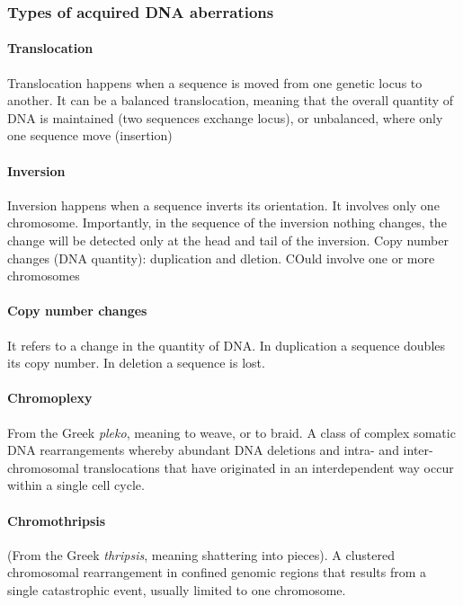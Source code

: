 		\subsubsection{Types of acquired DNA aberrations} \label{subsec:aberrations}
		

			\paragraph*{Translocation}
			Translocation happens when a sequence is moved from one genetic locus to another.
			It can be a balanced translocation, meaning that the overall quantity of DNA is maintained (two sequences exchange locus), or unbalanced, where only one sequence move (insertion) 

			\paragraph*{Inversion}
			Inversion happens when a sequence inverts its orientation. It involves only one 		chromosome.
			Importantly, in the sequence of the inversion nothing changes, the change will be detected only at the head and tail of the inversion.
Copy number changes (DNA quantity): duplication and dletion. COuld involve one or more chromosomes

			\paragraph*{Copy number changes}
			It refers to a change in the quantity of DNA. 
			In duplication a sequence doubles its copy number.
			In deletion a sequence is lost.

			\paragraph*{Chromoplexy}
			From the Greek \textit{pleko}, meaning to weave, or to braid.
A class of complex somatic DNA rearrangements whereby abundant DNA deletions
and intra- and inter-chromosomal translocations that have originated in an
interdependent way occur within a single cell cycle. 

			\paragraph*{Chromothripsis}
			(From the Greek \textit{thripsis}, meaning shattering into pieces).
A clustered chromosomal rearrangement in confined genomic regions that results
from a single catastrophic event, usually limited to one chromosome. 
